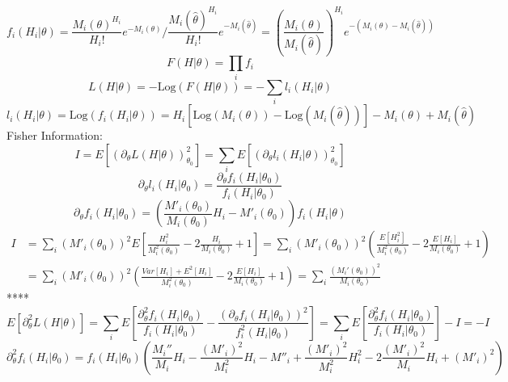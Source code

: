 \documentclass[12pt]{report}
\begin{document}
\begin{equation}
f_i(H_i|\theta)=\frac{M_i(\theta)^{H_i}}{H_i!}e^{-M_i(\theta)}/\frac{M_i(\hat{\theta})^{H_i}}{H_i!}e^{-M_i(\hat{\theta})}=\left(\frac{M_i(\theta)}{M_i(\hat{\theta})}\right)^{H_i}e^{-(M_i(\theta)-M_i(\hat{\theta}))}
\end{equation}
\begin{equation}
F(H|\theta)=\prod_if_i
\end{equation}
\begin{equation}
L(H|\theta)=-\text{Log}(F(H|\theta))=-\sum_il_i(H_i|\theta)
\end{equation}
\begin{equation}
l_i(H_i|\theta)=\text{Log}(f_i(H_i|\theta))=H_i\left[\text{Log}(M_i(\theta))-\text{Log}(M_i(\hat{\theta}))\right]-M_i(\theta)+M_i(\hat{\theta})
\end{equation}
Fisher Information:
\begin{equation}
I=E\left[(\partial_\theta L(H|\theta))^2_{\theta_0}\right]=\sum_iE\left[(\partial_\theta l_i(H_i|\theta))^2_{\theta_0}\right]
\end{equation}
\begin{equation}
\partial_\theta l_i(H_i|\theta_0)=\frac{\partial_\theta f_i(H_i|\theta_0)}{f_i(H_i|\theta_0)}
\end{equation}
\begin{equation}
\partial_\theta f_i(H_i|\theta_0)=\left(\frac{M'_i(\theta_0)}{M_i(\theta_0)}H_i-M'_i(\theta_0)\right)f_i(H_i|\theta)
\end{equation}
\begin{equation}
\begin{split}
I&=\sum_i(M'_i(\theta_0))^2E\left[\frac{H_i^2}{M_i^2(\theta_0)}-2\frac{H_i}{M_i(\theta_0)}+1\right]=\sum_i(M'_i(\theta_0))^2\left(\frac{E[H_i^2]}{M_i^2(\theta_0)}-2\frac{E[H_i]}{M_i(\theta_0)}+1\right)\\
&=\sum_i(M'_i(\theta_0))^2\left(\frac{Var[H_i]+E^2[H_i]}{M_i^2(\theta_0)}-2\frac{E[H_i]}{M_i(\theta_0)}+1\right)=\sum_i\frac{(M_i'(\theta_0))^2}{M_i(\theta_0)}
\end{split}
\end{equation}
****
\begin{equation}
E[\partial^2_\theta L(H|\theta)]=\sum_iE\left[\frac{\partial^2_\theta f_i(H_i|\theta_0)}{f_i(H_i|\theta_0)}-\frac{(\partial_{\theta}f_i(H_i|\theta_0))^2}{f_i^2(H_i|\theta_0)}\right]=\sum_iE\left[\frac{\partial^2_\theta f_i(H_i|\theta_0)}{f_i(H_i|\theta_0)}\right]-I=-I
\end{equation}
\begin{equation}
\partial^2_\theta f_i(H_i|\theta_0)=f_i(H_i|\theta_0)\left(\frac{M_i''}{M_i}H_i-\frac{(M'_i)^2}{M_i^2}H_i-M''_i+\frac{(M'_i)^2}{M_i^2}H_i^2-2\frac{(M'_i)^2}{M_i}H_i+(M'_i)^2\right)
\end{equation}
\end{document}
